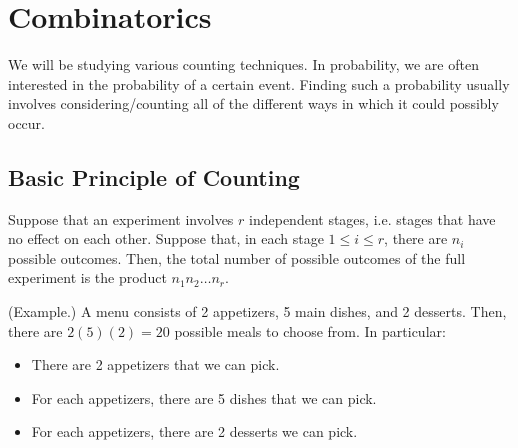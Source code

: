 \documentclass[letterpaper]{article}
\begin{document}
\section{Combinatorics}
We will be studying various counting techniques. In probability, we are often interested in the probability of a certain event. Finding such a probability usually involves considering/counting all of the different ways in which it could possibly occur. 

\subsection{Basic Principle of Counting}
Suppose that an experiment involves $r$ independent stages, i.e. stages that have no effect on each other. Suppose that, in each stage $1 \leq i \leq r$, there are $n_i$ possible outcomes. Then, the total number of possible outcomes of the full experiment is the product $n_1 n_2 \dots n_r$. 

\begin{mdframed}[]
    (Example.) A menu consists of 2 appetizers, 5 main dishes, and 2 desserts. Then, there are $2(5)(2) = 20$ possible meals to choose from. In particular: 
    \begin{itemize}
        \item There are 2 appetizers that we can pick. 
        \item For each appetizers, there are 5 dishes that we can pick.
        \item For each appetizers, there are 2 desserts we can pick. 
    \end{itemize}
\end{mdframed}
\end{document}

